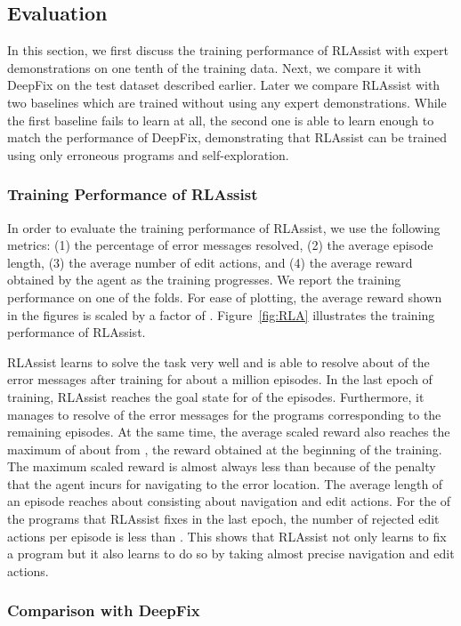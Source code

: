 \documentclass{article}
\begin{document}
\subsection{Evaluation}

In this section, we first discuss the training performance of RLAssist with expert demonstrations on one tenth of the training data. Next, we compare it with DeepFix on the test dataset described earlier. Later we compare RLAssist with two baselines which are trained without using any expert demonstrations. While the first baseline fails to learn at all, the second one is able to learn enough to match the performance of DeepFix, demonstrating that RLAssist can be trained using only erroneous programs and self-exploration.

\subsubsection{Training Performance of RLAssist}
In order to evaluate the training performance of RLAssist, we use the following metrics: (1) the percentage of error messages resolved, (2) the average episode length, (3) the average number of edit actions, and (4) the average reward obtained by the agent as the training progresses.
We report the training performance on one of the folds.
For ease of plotting, the average reward shown in the figures is scaled by a factor of .
Figure~\ref{fig:RLA} illustrates the training performance of RLAssist.

RLAssist learns to solve the task very well and is able to resolve about  of the error messages after training for about a million episodes.
In the last epoch of training, RLAssist reaches the goal state for  of the episodes.
Furthermore, it manages to resolve  of the error messages for the programs corresponding to the remaining  episodes.
At the same time, the average scaled reward also reaches the maximum of about  from , the reward obtained at the beginning of the training.
The maximum scaled reward is almost always less than  because of the penalty that the agent incurs for navigating to the error location.
The average length of an episode reaches about  consisting about  navigation and  edit actions.
For the  of the programs that RLAssist fixes in the last epoch, the number of rejected edit actions per episode is less than .
This shows that RLAssist not only learns to fix a program but it also learns to do so by taking almost precise navigation and edit actions.

\subsubsection{Comparison with DeepFix}
\end{document}
